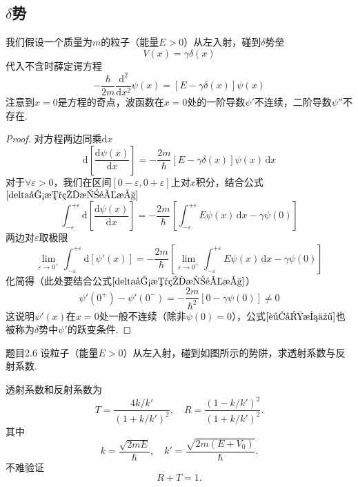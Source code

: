 \subsection{\texorpdfstring{$\delta$}{δ}势}
我们假设一个质量为$m$的粒子（能量$E>0$）从左入射，碰到$\delta$势垒
$$
    V(x)=\gamma\delta(x)
$$
代入不含时薛定谔方程
$$
    -\frac{\hbar}{2m}\frac{\mathrm{d}^2}{\mathrm{d}x^2}\psi(x)
    =[E-\gamma\delta(x)]\psi(x)
$$
注意到$x=0$是方程的奇点，波函数在$x=0$处的一阶导数$\psi'$不连续，二阶导数$\psi''$不存在.
\begin{proof}
    对方程两边同乘$\mathrm{d}x$
    $$
        \mathrm{d}\left[\frac{\mathrm{d}\psi(x)}{\mathrm{d}x}\right]
        =-\frac{2m}{\hbar}[E-\gamma\delta(x)]\psi(x)\,\mathrm{d}x
    $$
    对于$\forall\varepsilon>0$，我们在区间$[0-\varepsilon, 0+\varepsilon]$上对$x$积分，结合公式$\eqref{delta函数的挑选性}$
    $$
        \int_{-\varepsilon}^{+\varepsilon}\mathrm{d}\left[\frac{\mathrm{d}\psi(x)}{\mathrm{d}x}\right]
        =-\frac{2m}{\hbar}\left[\int_{-\varepsilon}^{+\varepsilon}E\psi(x)\,\mathrm{d}x-\gamma\psi(0)\right]
    $$
    两边对$\varepsilon$取极限
    $$
        \lim_{\varepsilon\to0^+}\int_{-\varepsilon}^{+\varepsilon}\mathrm{d}\left[\psi'(x)\right]
        =-\frac{2m}{\hbar}\left[\lim_{\varepsilon\to0^+}\int_{-\varepsilon}^{+\varepsilon}E\psi(x)\,\mathrm{d}x-\gamma\psi(0)\right]
    $$
    化简得（此处要结合公式$\eqref{delta函数的挑选性}$）
    \begin{equation}\label{跃变条件}
        \psi'(0^+)-\psi'(0^-) = -\frac{2m}{\hbar^2}[0-\gamma\psi(0)] \neq 0
    \end{equation}
    这说明$\psi'(x)$在$x=0$处一般不连续（除非$\psi(0)=0$），公式$\eqref{跃变条件}$也被称为$\delta$势中$\psi'$的跃变条件.
\end{proof}



\begin{question}{题目2.6}
    设粒子（能量$E>0$）从左入射，碰到如图所示的势阱，求透射系数与反射系数.
    \begin{center}
    \end{center}
\end{question}
\begin{solution}
    透射系数和反射系数为
    $$
        T=\frac{4k/k'}{(1+k/k')^2}, \quad R=\frac{(1-k/k')^2}{(1+k/k')^2}.
    $$
    其中
    $$
        k=\frac{\sqrt{2mE}}{\hbar}, \quad k'=\frac{\sqrt{2m(E+V_0)}}{\hbar}.
    $$
    不难验证
    $$
        R+T=1.
    $$
\end{solution}



